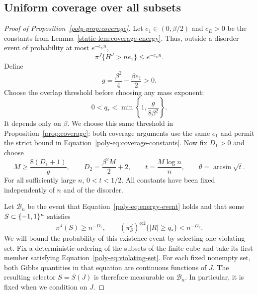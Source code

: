 \subsection{Uniform coverage over all subsets}

\begin{proof}[Proof of Proposition~\ref{poly-prop:coverage}]
Let $e_1\in(0,\beta/2)$ and $c_E>0$ be the constants from
Lemma~\ref{static-lem:coverage-energy}. Thus, outside a disorder event
of probability at most $e^{-c_En}$,
\begin{equation}\label{poly-eq:energy-event}
 \pi^J\{H^J>ne_1\}\le e^{-c_En}.
\end{equation}
Define
\[
 g=\frac{\beta^2}{4}-\frac{\beta e_1}{2}>0.
\]
Choose the overlap threshold before choosing any mass exponent:
\begin{equation}\label{poly-eq:coverage-constants}
 0<q_*<\min\left\{1,\frac{g}{8\beta^2}\right\}.
\end{equation}
It depends only on $\beta$. We choose this same threshold in
Proposition~\ref{prop:coverage}: both coverage arguments use the same
$e_1$ and permit the strict bound in
Equation~\eqref{poly-eq:coverage-constants}. Now fix $D_1>0$ and choose
\begin{equation}\label{poly-eq:coverage-parameters}
 M\ge\frac{8(D_1+1)}g,\qquad
 D_2=\frac{\beta^2M}{2}+2,\qquad
 t=\frac{M\log n}{n},\qquad \theta=\arcsin\sqrt t.
\end{equation}
For all sufficiently large $n$, $0<t<1/2$.
All constants have been fixed independently of $n$ and of the disorder.

Let $\mathcal B_n$ be the event that
Equation~\eqref{poly-eq:energy-event} holds and that some $S\subset\{-1,1\}^n$
satisfies
\begin{equation}\label{poly-eq:violating-set}
 \pi^J(S)\ge n^{-D_1},\qquad
 (\pi_S^J)^{\otimes2}\{|R|\ge q_*\}<n^{-D_2}.
\end{equation}
We will bound the probability of this existence event by selecting one
violating set. Fix a deterministic ordering of the subsets of the finite
cube and take its first member satisfying
Equation~\eqref{poly-eq:violating-set}. For each fixed nonempty set, both
Gibbs quantities in that equation are continuous functions of $J$.
The resulting selector $S=S(J)$ is therefore measurable on
$\mathcal B_n$. In particular, it is fixed when we condition on $J$.


\end{proof}
